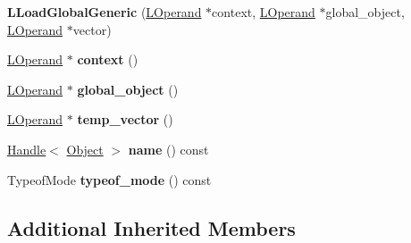 \begin{DoxyCompactItemize}
\item 
{\bfseries L\+Load\+Global\+Generic} (\hyperlink{classv8_1_1internal_1_1_l_operand}{L\+Operand} $\ast$context, \hyperlink{classv8_1_1internal_1_1_l_operand}{L\+Operand} $\ast$global\+\_\+object, \hyperlink{classv8_1_1internal_1_1_l_operand}{L\+Operand} $\ast$vector)\hypertarget{classv8_1_1internal_1_1_l_load_global_generic_a5992cad6cdc59da767d3d35fdbf4c4f7}{}\label{classv8_1_1internal_1_1_l_load_global_generic_a5992cad6cdc59da767d3d35fdbf4c4f7}

\item 
\hyperlink{classv8_1_1internal_1_1_l_operand}{L\+Operand} $\ast$ {\bfseries context} ()\hypertarget{classv8_1_1internal_1_1_l_load_global_generic_acb9446dcc83f4319988b01ff0d957bf6}{}\label{classv8_1_1internal_1_1_l_load_global_generic_acb9446dcc83f4319988b01ff0d957bf6}

\item 
\hyperlink{classv8_1_1internal_1_1_l_operand}{L\+Operand} $\ast$ {\bfseries global\+\_\+object} ()\hypertarget{classv8_1_1internal_1_1_l_load_global_generic_a43bc76ffc93765b0231ba74a702acb19}{}\label{classv8_1_1internal_1_1_l_load_global_generic_a43bc76ffc93765b0231ba74a702acb19}

\item 
\hyperlink{classv8_1_1internal_1_1_l_operand}{L\+Operand} $\ast$ {\bfseries temp\+\_\+vector} ()\hypertarget{classv8_1_1internal_1_1_l_load_global_generic_a6e6428d159408fa7d9a31d38cc08919c}{}\label{classv8_1_1internal_1_1_l_load_global_generic_a6e6428d159408fa7d9a31d38cc08919c}

\item 
\hyperlink{classv8_1_1internal_1_1_handle}{Handle}$<$ \hyperlink{classv8_1_1internal_1_1_object}{Object} $>$ {\bfseries name} () const \hypertarget{classv8_1_1internal_1_1_l_load_global_generic_a8986cdf04702fb63aee12526199431ab}{}\label{classv8_1_1internal_1_1_l_load_global_generic_a8986cdf04702fb63aee12526199431ab}

\item 
Typeof\+Mode {\bfseries typeof\+\_\+mode} () const \hypertarget{classv8_1_1internal_1_1_l_load_global_generic_a92314902b26af0eba30f17b3c9e9d768}{}\label{classv8_1_1internal_1_1_l_load_global_generic_a92314902b26af0eba30f17b3c9e9d768}

\end{DoxyCompactItemize}
\subsection*{Additional Inherited Members}


